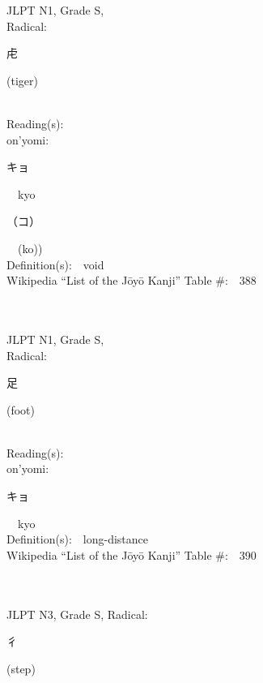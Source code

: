\begin{multicols}{2}
{JLPT N1, Grade S, \\Radical:\ \ {\begin{CJK}{UTF8}{min} 虍 \end{CJK}} (tiger) } \\
Reading(s):\ \ \\
{\hspace*{1em}}on'yomi:\ \ \\
{\hspace*{2em}}{\begin{CJK}{UTF8}{min} キョ \end{CJK}}\ \ kyo\ \ \\
{\hspace*{2em}}{\begin{CJK}{UTF8}{min} （コ） \end{CJK}}\ \ (ko))\ \ \\
Definition(s):\ \ void \\
Wikipedia ``List of the J\=oy\=o Kanji'' Table \#:\ \ 388 \\
\ \ \\
{\fontsize{34pt}{40pt}  }\ \ \\
{JLPT N1, Grade S, \\Radical:\ \ {\begin{CJK}{UTF8}{min} 足 \end{CJK}} (foot) } \\
Reading(s):\ \ \\
{\hspace*{1em}}on'yomi:\ \ \\
{\hspace*{2em}}{\begin{CJK}{UTF8}{min} キョ \end{CJK}}\ \ kyo\ \ \\
Definition(s):\ \ long-distance \\
Wikipedia ``List of the J\=oy\=o Kanji'' Table \#:\ \ 390 \\
\ \ \\
{\fontsize{34pt}{40pt}  }\ \ \\  %
{JLPT N3, Grade S, Radical:\ \ {\begin{CJK}{UTF8}{min} 彳 \end{CJK}} (step) } \\

\end{multicols}
